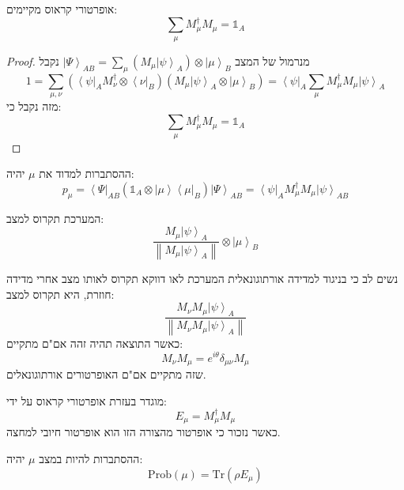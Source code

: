 \documentclass{tstextbook}
\begin{document}
\begin{proposition}
אופרטורי קראוס מקיימים:
$$\sum_{\mu}M_{\mu}^{\dagger}M_{\mu}=\mathbb{1}_{A}$$

\end{proposition}
\begin{proof}
מנרמול של המצב \(\left|\Psi\right\rangle_{A B}=\sum_{\mu}\left(M_{\mu}\left|\psi\right\rangle_{A}\right)\otimes\left|\mu\right\rangle_{B}\) נקבל
$$1=\sum_{\mu,\nu}\left(\left\langle\psi\right|_{A}M_{\nu}^{\dagger}\otimes\left\langle\nu\right|_{B}\right)\left(M_{\mu}\left|\psi\right\rangle_{A}\otimes\left|\mu\right\rangle_{B}\right)=\left\langle\psi\right|_{A}\sum_{\mu}M_{\mu}^{\dagger}M_{\mu}\left|\psi\right\rangle_{A}$$
מזה נקבל כי:
$$\sum_{\mu}M_{\mu}^{\dagger}M_{\mu}=\mathbb{1}_{A}$$

\end{proof}
\begin{proposition}
ההסתברות למדוד את \(\mu\) יהיה:
$$p_{\mu}=\left\langle\Psi\right|_{A B}\left(\mathbb{1}_{A}\otimes\left|\mu\right\rangle\left\langle\mu\right|_{B}\right)\left|\Psi\right\rangle_{A B}=\left\langle\psi\right|_{A}M_{\mu}^{\dagger}M_{\mu}\left|\psi\right\rangle_{A B}$$

\end{proposition}
\begin{proposition}
המערכת תקרוס למצב:
$$\frac{M_{\mu}\left|\psi\right\rangle_{A}}{\left\|M_{\mu}\left|\psi\right\rangle_{A}\right\|}\otimes\left|\mu\right\rangle_{B}$$

\end{proposition}
\begin{remark}
נשים לב כי בניגוד למדידה אורתוגונאלית המערכת לאו דווקא תקרוס לאותו מצב אחרי מדידה חוזרת, היא תקרוס למצב:
$$\frac{M_{\nu}M_{\mu}\left|\psi\right\rangle_{A}}{\left\|M_{\nu}M_{\mu}\left|\psi\right\rangle_{A}\right\|}$$
כאשר התוצאה תהיה זהה אם"ם מתקיים:
$$M_{\nu}M_{\mu}=e^{i\theta}\delta_{\mu\nu}M_{\mu}$$
שזה מתקיים אם"ם האופרטורים אורתוגונאלים.

\end{remark}
\begin{definition}
מוגדר בעזרת אופרטורי קראוס על ידי:
$$E_{\mu}=M_{\mu}^{\dagger} M_{\mu}$$
כאשר נזכור כי אופרטור מהצורה הזו הוא אופרטור חיובי למחצה.

\end{definition}
\begin{proposition}
ההסתברות להיות במצב \(\mu\) יהיה:
$$\mathrm{Prob}\left( \mu \right)=\mathrm{Tr}\left( \rho E_{\mu} \right)$$

\end{proposition}
\end{document}
